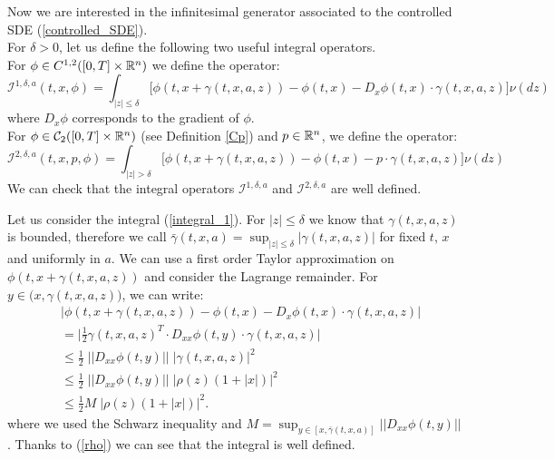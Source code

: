 Now we are interested in the infinitesimal generator associated to the controlled SDE (\ref{controlled_SDE}). \\
For $\delta > 0$, let us define the following two useful integral operators. \\ \noindent
For $\phi \in C^{1,2}([0,T] \times \mathbb{R}^n) $ we define the operator:
\begin{equation}\label{integral_1}
 \mathcal{I}^{1,\delta,a}(t,x,\phi) = \int_{|z| \leq \delta}
\biggl[ \phi(t,x + \gamma(t,x,a,z)) - \phi(t,x) - D_x \phi(t,x) \cdot \gamma(t,x,a,z) \biggr] \nu(dz)
\end{equation}
where $D_x \phi$ corresponds to the gradient of $\phi$.\\
For $\phi \in \mathcal{C}_2([0,T] \times \mathbb{R}^n) $ (see Definition \ref{Cp}) and $p \in \mathbb{R}^n$, we define the operator:
\begin{equation}\label{integral_2}
\mathcal{I}^{2,\delta,a}(t,x,p,\phi) = \int_{|z| > \delta}
\biggl[ \phi(t,x+ \gamma(t,x,a,z)) - \phi(t,x) - p \cdot \gamma(t,x,a,z) \biggr] \nu(dz)
\end{equation}
We can check that the integral operators $\mathcal{I}^{1,\delta,a}$ and $\mathcal{I}^{2,\delta,a}$ are well defined.

Let us consider the integral (\ref{integral_1}). For $|z| \leq \delta$ we know that $\gamma(t,x,a,z)$ is bounded, therefore we call  
$ \bar \gamma(t,x,a) = \sup_{|z| \leq \delta} |\gamma(t,x,a,z)|$ for fixed $t$, $x$ and uniformly in $a$. 
We can use a first order Taylor approximation on $\phi(t,x + \gamma(t,x,a,z))$ and consider the Lagrange remainder. 
For $y \in \bigl(x, \gamma(t,x,a,z)\bigr)$, we can write:
\begin{align*}
 & \bigg|\phi(t,x + \gamma(t,x,a,z)) - \phi(t,x) - D_x \phi(t,x) \cdot \gamma(t,x,a,z) \bigg| \\ 
 & = \bigg| \frac{1}{2} \gamma(t,x,a,z)^T \cdot  D_{xx} \phi(t,y) \cdot \gamma(t,x,a,z) \bigg| \\   %
 & \leq \frac{1}{2} \; \bigg|\bigg| D_{xx} \phi(t,y) \bigg|\bigg| \;  \big| \gamma(t,x,a,z) \big|^2 \\
 & \leq \frac{1}{2} \; \bigg|\bigg| D_{xx} \phi(t,y) \bigg|\bigg| \; \big| \rho(z) (1+|x|)  \big|^2 \\
 & \leq \frac{1}{2} M \; \big| \rho(z) (1+|x|)  \big|^2.
\end{align*}
where we used the Schwarz inequality and $M = \sup_{y \in [x, \bar \gamma(t,x,a)]} || D_{xx} \phi(t,y) ||$. 
Thanks to (\ref{rho}) we can see that the integral is well defined.

